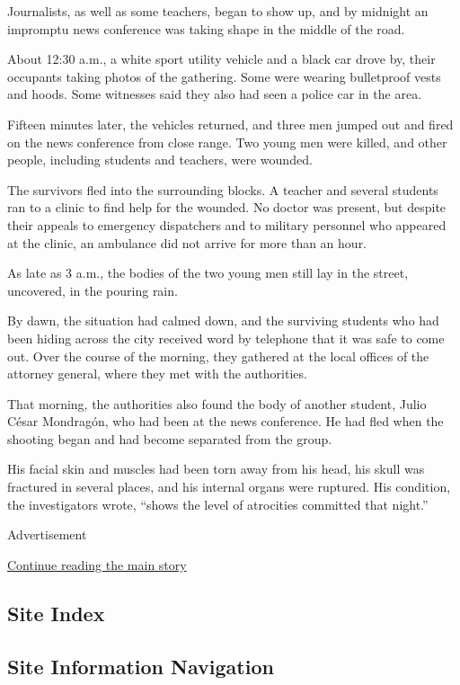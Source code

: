 Journalists, as well as some teachers, began to show up, and by midnight
an impromptu news conference was taking shape in the middle of the road.

About 12:30 a.m., a white sport utility vehicle and a black car drove
by, their occupants taking photos of the gathering. Some were wearing
bulletproof vests and hoods. Some witnesses said they also had seen a
police car in the area.

Fifteen minutes later, the vehicles returned, and three men jumped out
and fired on the news conference from close range. Two young men were
killed, and other people, including students and teachers, were wounded.

The survivors fled into the surrounding blocks. A teacher and several
students ran to a clinic to find help for the wounded. No doctor was
present, but despite their appeals to emergency dispatchers and to
military personnel who appeared at the clinic, an ambulance did not
arrive for more than an hour.

As late as 3 a.m., the bodies of the two young men still lay in the
street, uncovered, in the pouring rain.

By dawn, the situation had calmed down, and the surviving students who
had been hiding across the city received word by telephone that it was
safe to come out. Over the course of the morning, they gathered at the
local offices of the attorney general, where they met with the
authorities.

That morning, the authorities also found the body of another student,
Julio César Mondragón, who had been at the news conference. He had fled
when the shooting began and had become separated from the group.

His facial skin and muscles had been torn away from his head, his skull
was fractured in several places, and his internal organs were ruptured.
His condition, the investigators wrote, ``shows the level of atrocities
committed that night.''

Advertisement

\protect\hyperlink{after-bottom}{Continue reading the main story}

\hypertarget{site-index}{%
\subsection{Site Index}\label{site-index}}

\hypertarget{site-information-navigation}{%
\subsection{Site Information
Navigation}\label{site-information-navigation}}

